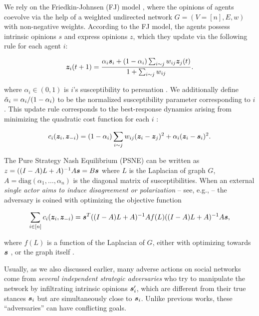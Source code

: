 We rely on the Friedkin-Johnsen (FJ) model \citep{Friedkin1990}, where the opinions of agents coevolve via the help of a weighted undirected network $G = (V = [n], E, w)$ with non-negative weights. According to the FJ model, the agents possess intrinsic opinions $s$ and express opinions $z$, which they update via the following rule for each agent $i$:  

\begin{equation}\label{eq:fj_dynamics}
    \bz_i(t + 1) = \frac {\alpha_i \bs_i + (1 - \alpha_i) \sum_{i \sim j} w_{ij} \bz_j(t)} {1 + \sum_{i \sim j} w_{ij}}.
\end{equation}

where $\alpha_i \in (0, 1)$ is $i$'s susceptibility to persuation \citep{abebe2018opinion}. We additionally define $\Tilde \alpha_i = \alpha_i / (1 - \alpha_i)$ to be the normalized susceptibility parameter corresponding to $i$. This update rule corresponds to the best-response dynamics arising from minimizing the quadratic cost function for each $i$ \citep{bindel2011,abebe2018opinion}:

\begin{equation} \label{eq:cost_fcn}
    c_i(\bz_i, \bz_{-i}) = (1 - \alpha_i) \sum_{i \sim j} w_{ij} (\bz_i - \bz_j)^2 + \alpha_i (\bz_i - \bs_i)^2.
\end{equation}

The Pure Strategy Nash Equilibrium (PSNE) can be written as $z = ((I - A)L + A)^{-1} A \bs = B \bs$ where $L$ is the Laplacian of graph $G$, $A = \mathrm{diag}(\alpha_1, \dots, \alpha_n)$ is the diagonal matrix of susceptibilities. When an external \textit{single actor aims to induce disagreement or polarization} -- see, e.g., \citet{gaitonde2020adversarial,racz2022towards,musco2018minimizing} -- the adversary is coined with optimizing the objective function 

\begin{equation*}
    \sum_{i \in [n]} c_i(\bz_i, \bz_{-i}) = \bs^T ((I - A)L + A)^{-1} A f(L) ((I - A)L + A)^{-1} A \bs,
\end{equation*}

where $f(L)$ is a function of the Laplacian of $G$, either with optimizing towards $\bs$ \citep{gaitonde2020adversarial}, or the graph itself \citep{musco2018minimizing,racz2022towards}. 

Usually, as we also discussed earlier, many adverse actions on social networks come from \textit{several independent strategic adversaries} who try to manipulate the network by infiltrating intrinsic opinions $\bs_i^\prime$, which are different from their true stances $\bs_i$ but are simultaneously close to $\bs_i$. Unlike previous works, these ``adversaries'' can have conflicting goals. 
\renewcommand{\bs}{\bm{s}}
\renewcommand{\RR}{\mathbb{R}}

